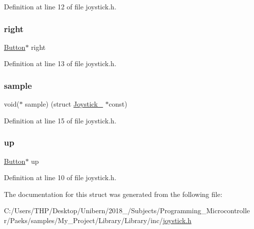 Definition at line 12 of file joystick.\+h.

\mbox{\label{struct_joystick___aa9275d605c1c2da3651589e1d55f9a1a}} 
\subsubsection{\texorpdfstring{right}{right}}
{\footnotesize\ttfamily \mbox{\hyperlink{button_8h_ab369ab7fa0b9a8dfec4fc1f653ac6de5}{Button}}$\ast$ right}



Definition at line 13 of file joystick.\+h.

\mbox{\label{struct_joystick___ad68253aed96c4f9e100a9fe238eea009}} 
\subsubsection{\texorpdfstring{sample}{sample}}
{\footnotesize\ttfamily void($\ast$ sample) (struct \mbox{\hyperlink{struct_joystick__}{Joystick\+\_\+}} $\ast$const)}



Definition at line 15 of file joystick.\+h.

\mbox{\label{struct_joystick___aae2bb22ae710c823853d95ae7057884e}} 
\subsubsection{\texorpdfstring{up}{up}}
{\footnotesize\ttfamily \mbox{\hyperlink{button_8h_ab369ab7fa0b9a8dfec4fc1f653ac6de5}{Button}}$\ast$ up}



Definition at line 10 of file joystick.\+h.



The documentation for this struct was generated from the following file\+:\begin{DoxyCompactItemize}
\item 
C\+:/\+Users/\+T\+H\+P/\+Desktop/\+Unibern/2018\+\_/\+Subjects/\+Programming\+\_\+\+Microcontroller/\+Paeks/samples/\+My\+\_\+\+Project/\+Library/\+Library/inc/\mbox{\hyperlink{joystick_8h}{joystick.\+h}}\end{DoxyCompactItemize}
